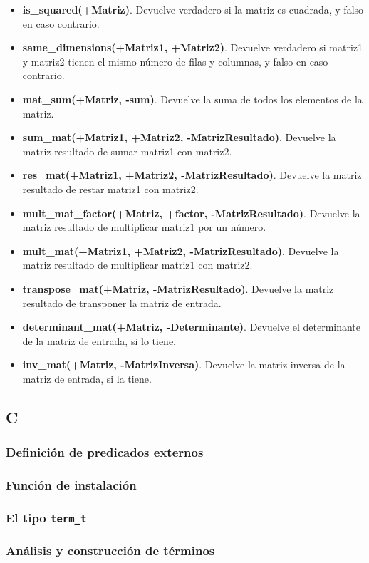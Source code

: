 \documentclass[a4paper,12pt]{article}
\begin{document}
\begin{itemize}
\item \textbf{is\_squared(+Matriz)}. Devuelve verdadero si la matriz es cuadrada, y falso en caso contrario.
\item \textbf{same\_dimensions(+Matriz1, +Matriz2)}. Devuelve verdadero si matriz1 y matriz2 tienen el mismo número de filas y columnas, y falso en caso contrario.
\item \textbf{mat\_sum(+Matriz, -sum)}. Devuelve la suma de todos los elementos de la matriz.
\item \textbf{sum\_mat(+Matriz1, +Matriz2, -MatrizResultado)}. Devuelve la matriz resultado de sumar matriz1 con matriz2.
\item \textbf{res\_mat(+Matriz1, +Matriz2, -MatrizResultado)}. Devuelve la matriz resultado de restar matriz1 con matriz2.
\item \textbf{mult\_mat\_factor(+Matriz, +factor, -MatrizResultado)}. Devuelve la matriz resultado de multiplicar matriz1 por un número.
\item \textbf{mult\_mat(+Matriz1, +Matriz2, -MatrizResultado)}. Devuelve la matriz resultado de multiplicar matriz1 con matriz2.
\item \textbf{transpose\_mat(+Matriz, -MatrizResultado)}. Devuelve la matriz resultado de transponer la matriz de entrada.
\item \textbf{determinant\_mat(+Matriz, -Determinante)}. Devuelve el determinante de la matriz de entrada, si lo tiene.
\item \textbf{inv\_mat(+Matriz, -MatrizInversa)}. Devuelve la matriz inversa de la matriz de entrada, si la tiene.
\end{itemize}
\subsection{C}
\subsubsection{Definición de predicados externos}
\subsubsection{Función de instalación}
\subsubsection{El tipo \texttt{term\_t}}
\subsubsection{Análisis y construcción de términos}
\end{document}
